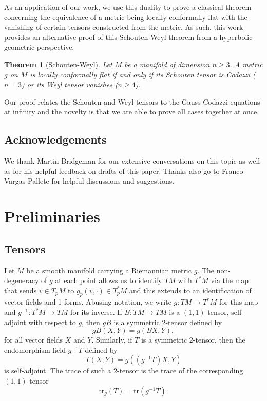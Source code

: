 \documentclass{amsart}
\newcommand{\tr}{\mathrm{tr}}
\newtheorem{bigthm}{Theorem}
\numberwithin{equation}{section}
\begin{document}
As an application of our work, we use this duality to prove a classical theorem concerning the equivalence of a metric being locally conformally flat with the vanishing of certain tensors constructed from the metric.
As such, this work provides an alternative proof of this Schouten-Weyl theorem from a hyperbolic-geometric perspective.

\begin{bigthm}[Schouten-Weyl]
Let $M$ be a manifold of dimension $n \geq 3$.
A metric $g$ on $M$ is locally conformally flat if and only if its Schouten tensor is Codazzi ($n = 3$) or its Weyl tensor vanishes ($n \geq 4$).
\end{bigthm}
\noindent
Our proof relates the Schouten and Weyl tensors to the Gauss-Codazzi equations at infinity and the novelty is that we are able to prove all cases together at once. 

\subsection*{Acknowledgements}
We thank Martin Bridgeman for our extensive conversations on this topic as well as for his helpful feedback on drafts of this paper.
Thanks also go to Franco Vargas Pallete for helpful discussions and suggestions. 


\section{Preliminaries}


\subsection{Tensors}

Let $M$ be a smooth manifold carrying a Riemannian metric $g$. 
The non-degeneracy of $g$ at each point allows us to identify $TM$ with $T^*M$ via the map that sends $v \in T_pM$ to $g_p(v,\cdot) \in T^*_pM$ and this extends to an identification of vector fields and 1-forms. 
Abusing notation, we write $g: TM \to T^*M$ for this map and $g^{-1}:T^*M \to TM$ for its inverse.
If $B:TM \to TM$ is a $(1,1)$-tensor, self-adjoint with respect to $g$, then $gB$ is a symmetric 2-tensor defined by
\[
gB(X,Y) = g(BX,Y),
\]
for all vector fields $X$ and $Y$.
Similarly, if $T$ is a symmetric 2-tensor, then the endomorphism field $g^{-1}T$ defined by 
\[
T(X,Y) = g( (g^{-1}T)X,Y)
\]
is self-adjoint.
The trace of such a $2$-tensor is the trace of the corresponding $(1,1)$-tensor
\[
\tr_g(T) = \tr(g^{-1}T).
\]
\end{document}
